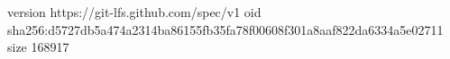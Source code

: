 version https://git-lfs.github.com/spec/v1
oid sha256:d5727db5a474a2314ba86155fb35fa78f00608f301a8aaf822da6334a5e02711
size 168917
